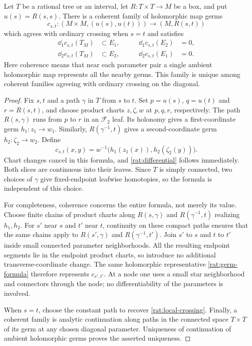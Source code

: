 \begin{lemma}\label{rat:germs}
Let $T$ be a rational tree or an interval, let $R:T\times T\to M$ be a
box, and put $u(s)=R(s,s)$. There is a coherent family of holomorphic
map germs
\[
c_{s,t}:(M\times M,(u(s),u(t)))\longrightarrow(M,R(s,t))
\]
which agrees with ordinary crossing when $s=t$ and satisfies
\begin{equation}\label{rat:differential}
\begin{aligned}
\dd_1c_{s,t}(T_M)&\subset E_1,&\qquad \dd_1c_{s,t}(E_2)&=0,\\
\dd_2c_{s,t}(T_M)&\subset E_2,&\qquad \dd_2c_{s,t}(E_1)&=0.
\end{aligned}
\end{equation}
Here coherence means that near each parameter pair a single ambient
holomorphic map represents all the nearby germs. This family is unique
among coherent families agreeing with ordinary crossing on the diagonal.
\end{lemma}

\begin{proof}
Fix $s,t$ and a path $\gamma$ in $T$ from $s$ to $t$. Set
$p=u(s)$, $q=u(t)$ and $r=R(s,t)$, and choose product charts
$z,\zeta,w$ at $p,q,r$, respectively. The path $R(s,\gamma)$ runs
from $p$ to $r$ in an $\mathcal F_2$ leaf. Its holonomy gives a
first-coordinate germ $h_1:z_1\to w_1$. Similarly,
$R(\gamma^{-1},t)$ gives a second-coordinate germ
$h_2:\zeta_2\to w_2$. Define
\begin{equation}\label{rat:germ-formula}
c_{s,t}(x,y)=w^{-1}\bigl(h_1(z_1(x)),h_2(\zeta_2(y))\bigr).
\end{equation}
Chart changes cancel in this formula, and
\eqref{rat:differential} follows immediately. Both slices are continuous
into their leaves. Since $T$ is simply connected, two choices of
$\gamma$ give fixed-endpoint leafwise homotopies, so the formula is
independent of this choice.

For completeness, coherence concerns the entire formula, not merely its
value. Choose finite chains of product charts along
$R(s,\gamma)$ and $R(\gamma^{-1},t)$ realizing $h_1,h_2$. For $s'$ near
$s$ and $t'$ near $t$, continuity on these compact paths ensures that
the same chains apply to $R(s',\gamma)$ and $R(\gamma^{-1},t')$. Join
$s'$ to $s$ and $t$ to $t'$ inside small connected parameter
neighborhoods. All the resulting endpoint segments lie in the endpoint
product charts, so introduce no additional transverse-coordinate
change. The same holomorphic representative
\eqref{rat:germ-formula} therefore represents $c_{s',t'}$. At a node
one uses a small star neighborhood and connectors through the node;
no differentiability of the parameters is involved.

When $s=t$, choose the constant path to recover
\eqref{rat:local-crossing}. Finally, a coherent family is analytic
continuation along paths in the connected space $T\times T$ of its
germ at any chosen diagonal parameter. Uniqueness of continuation of
ambient holomorphic germs proves the asserted uniqueness.
\end{proof}

